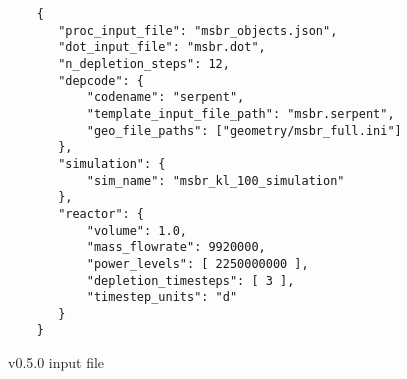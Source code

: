 \begin{listing}[!ht]
    \begin{verbatim}
    {
       "proc_input_file": "msbr_objects.json",
       "dot_input_file": "msbr.dot",
       "n_depletion_steps": 12,
       "depcode": {
           "codename": "serpent",
           "template_input_file_path": "msbr.serpent",
           "geo_file_paths": ["geometry/msbr_full.ini"]
       },
       "simulation": {
           "sim_name": "msbr_kl_100_simulation"
       },
       "reactor": {
           "volume": 1.0,
           "mass_flowrate": 9920000,
           "power_levels": [ 2250000000 ],
           "depletion_timesteps": [ 3 ],
           "timestep_units": "d"
       }
    }
    \end{verbatim}
    \caption{\SaltProc v0.5.0 input file}
    \label{listing:3}
\end{listing}


